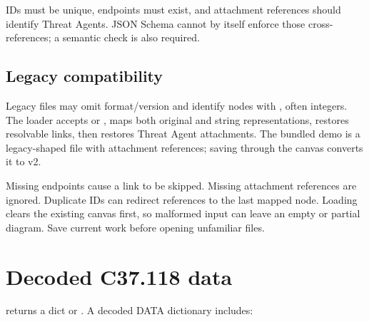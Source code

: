 IDs must be unique, endpoints must exist, and attachment references should identify Threat Agents. JSON Schema cannot by itself enforce those cross-references; a semantic check is also required.

\subsection*{Legacy compatibility}
Legacy files may omit format/version and identify nodes with , often integers. The loader accepts  or , maps both original and string representations, restores resolvable links, then restores Threat Agent attachments. The bundled demo is a legacy-shaped file with attachment references; saving through the canvas converts it to v2.

Missing endpoints cause a link to be skipped. Missing attachment references are ignored. Duplicate IDs can redirect references to the last mapped node. Loading clears the existing canvas first, so malformed input can leave an empty or partial diagram. Save current work before opening unfamiliar files.

\section*{Decoded C37.118 data}
 returns a dict or . A decoded DATA dictionary includes:

